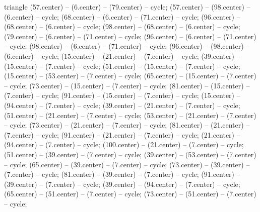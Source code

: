 \begin{pgfonlayer}{triangle}
 (57.center) -- (6.center) -- (79.center) -- cycle; 
 (57.center) -- (98.center) -- (6.center) -- cycle; 
 (68.center) -- (6.center) -- (71.center) -- cycle; 
 (96.center) -- (68.center) -- (6.center) -- cycle; 
 (98.center) -- (68.center) -- (6.center) -- cycle; 
 (79.center) -- (6.center) -- (71.center) -- cycle; 
 (96.center) -- (6.center) -- (71.center) -- cycle; 
 (98.center) -- (6.center) -- (71.center) -- cycle; 
 (96.center) -- (98.center) -- (6.center) -- cycle; 
 (15.center) -- (21.center) -- (7.center) -- cycle; 
 (39.center) -- (15.center) -- (7.center) -- cycle; 
 (51.center) -- (15.center) -- (7.center) -- cycle; 
 (15.center) -- (53.center) -- (7.center) -- cycle; 
 (65.center) -- (15.center) -- (7.center) -- cycle; 
 (73.center) -- (15.center) -- (7.center) -- cycle; 
 (81.center) -- (15.center) -- (7.center) -- cycle; 
 (91.center) -- (15.center) -- (7.center) -- cycle; 
 (15.center) -- (94.center) -- (7.center) -- cycle; 
 (39.center) -- (21.center) -- (7.center) -- cycle; 
 (51.center) -- (21.center) -- (7.center) -- cycle; 
 (53.center) -- (21.center) -- (7.center) -- cycle; 
 (73.center) -- (21.center) -- (7.center) -- cycle; 
 (81.center) -- (21.center) -- (7.center) -- cycle; 
 (91.center) -- (21.center) -- (7.center) -- cycle; 
 (21.center) -- (94.center) -- (7.center) -- cycle; 
 (100.center) -- (21.center) -- (7.center) -- cycle; 
 (51.center) -- (39.center) -- (7.center) -- cycle; 
 (39.center) -- (53.center) -- (7.center) -- cycle; 
 (65.center) -- (39.center) -- (7.center) -- cycle; 
 (73.center) -- (39.center) -- (7.center) -- cycle; 
 (81.center) -- (39.center) -- (7.center) -- cycle; 
 (91.center) -- (39.center) -- (7.center) -- cycle; 
 (39.center) -- (94.center) -- (7.center) -- cycle; 
 (65.center) -- (51.center) -- (7.center) -- cycle; 
 (73.center) -- (51.center) -- (7.center) -- cycle; 

\end{pgfonlayer}
